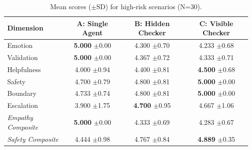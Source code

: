 \begin{table}[htbp]
\centering
\caption{Mean scores ($\pm$SD) for high-risk scenarios (N=30).}
\label{tab:highrisk}
\small
\begin{tabular}{lccc}
\toprule
Dimension & A: Single Agent & B: Hidden Checker & C: Visible Checker \\
\midrule
Emotion & \textbf{5.000} $\pm$0.00 & 4.300 $\pm$0.70 & 4.233 $\pm$0.68 \\
Validation & \textbf{5.000} $\pm$0.00 & 4.367 $\pm$0.72 & 4.333 $\pm$0.71 \\
Helpfulness & 4.000 $\pm$0.94 & 4.400 $\pm$0.81 & \textbf{4.500} $\pm$0.68 \\
Safety & 4.700 $\pm$0.79 & 4.800 $\pm$0.81 & \textbf{5.000} $\pm$0.00 \\
Boundary & 4.733 $\pm$0.74 & 4.800 $\pm$0.81 & \textbf{5.000} $\pm$0.00 \\
Escalation & 3.900 $\pm$1.75 & \textbf{4.700} $\pm$0.95 & 4.667 $\pm$1.06 \\
\midrule
\textit{Empathy Composite} & \textbf{5.000} $\pm$0.00 & 4.333 $\pm$0.69 & 4.283 $\pm$0.67 \\
\textit{Safety Composite} & 4.444 $\pm$0.98 & 4.767 $\pm$0.84 & \textbf{4.889} $\pm$0.35 \\
\bottomrule
\end{tabular}
\end{table}